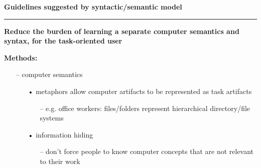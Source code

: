 \documentclass[pdf]{beamer}
\begin{document}
\begin{frame}
\vspace{8mm}
\textcolor{myBlue}{\textbf{\Large{Guidelines suggested by syntactic/semantic model}}}

\textcolor{red}{\rule{10cm}{1mm}}

\begin{small}

\textbf{Reduce the burden of learning a separate computer semantics and syntax, for the task-oriented user}
\newline

\textbf{Methods:}

\begin{itemize}
\item [\textcolor{black}{--}]computer semantics
     \begin{itemize}
     \item [\textcolor{black}{•}]metaphors allow computer artifacts to be represented as task artifacts
           \begin{itemize}
           \item [\textcolor{black}{--}]e.g. office workers: files/folders represent hierarchical directory/file systems
           \end{itemize}
     \item [\textcolor{black}{•}]information hiding
           \begin{itemize}
           \item [\textcolor{black}{--}]don’t force people to know computer concepts that are not   relevant to their work
           \end{itemize}
      \end{itemize}
\end{itemize}
\medskip
\end{small}
\end{frame}
\end{document}
